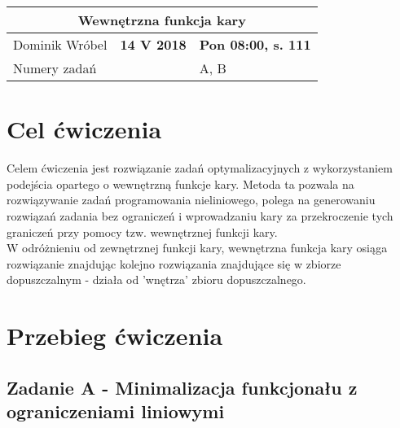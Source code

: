 \documentclass[a4paper,15pt]{article}
\begin{document}
\tableofcontents

\begin{table}
\begin{center}
\begin{tabular}{|l|l|l|}
\hline
\multicolumn{3}{|c|}{\textbf{Wewnętrzna funkcja kary}} \\ \hline Dominik Wróbel & \textbf{14 V 2018} & \textbf{Pon 08:00, s. 111} \\ \hline
\multicolumn{2}{|l|}{Numery zadań} & A, B \\ \hline 

\end{tabular}
\end{center}
\end{table}

\section{Cel ćwiczenia}
Celem ćwiczenia jest rozwiązanie zadań optymalizacyjnych z wykorzystaniem podejścia opartego o wewnętrzną funkcje kary. Metoda ta pozwala na rozwiązywanie zadań programowania nieliniowego, polega na generowaniu rozwiązań zadania bez ograniczeń i wprowadzaniu kary za przekroczenie tych graniczeń przy pomocy tzw. wewnętrznej funkcji kary. \\
W odróżnieniu od zewnętrznej funkcji kary, wewnętrzna funkcja kary osiąga rozwiązanie znajdując kolejno rozwiązania znajdujące się w zbiorze dopuszczalnym - działa od 'wnętrza' zbioru dopuszczalnego.
\section{Przebieg ćwiczenia}
\subsection{Zadanie A - Minimalizacja funkcjonału z ograniczeniami liniowymi }
\end{document}
